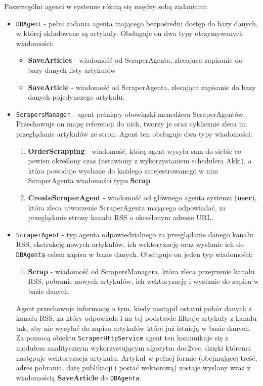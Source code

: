 \par Poszczególni agenci w systemie różnią się między sobą zadaniami:
\begin{itemize}
	\item \texttt{DBAgent} - pełni zadania agenta mającego bezpośredni dostęp do bazy danych, w której składowane są artykuły. Obsługuje on dwa typy otrzymywanych wiadomości:
     \begin{itemize}
      \item \textbf{SaveArticles} - wiadomość od ScraperAgenta, zlecająca zapisanie do bazy danych listy artykułów
      \item \textbf{SaveArticle} - wiadomość od ScraperAgenta, zlecająca zapisanie do bazy danych pojedynczego artykułu.
     \end{itemize}
                                                                                                                                    	\item \texttt{ScrapersManager} - agent pełniący obowiązki menedżera ScraperAgentów. Przechowuje on mapę referencji do nich, tworzy je oraz cyklicznie zleca im przeglądanie artykułów ze stron. Agent ten obsługuje dwa typy wiadomości:
     \begin{enumerate}
      \item \textbf{OrderScrapping} - wiadomość, którą agent wysyła sam do siebie co pewien określony czas (ustawiony z wykorzystaniem schedulera Akki), a która powoduje wysłanie do każdego zarejestrowanego w nim ScraperAgenta wiadomości typu \textbf{Scrap}
      \item \textbf{CreateScraperAgent} - wiadomość od głównego agenta systemu (\textbf{user}), która zleca utworzenie ScraperAgenta mającego odpowiadać, za przeglądanie strony kanału RSS o określonym adresie URL.
     \end{enumerate}
                                                                                                                                    	\item \texttt{ScraperAgent} - typ agenta odpowiedzialnego za przeglądanie danego kanału RSS, ekstrakcję nowych artykułów, ich wektoryzację oraz wysłanie ich do \texttt{DBAgenta} celem zapisu w bazie danych. Obsługuje on jeden typ wiadomości:
     \begin{enumerate}
      \item \textbf{Scrap} - wiadomość od ScrapersManagera, która zleca przejrzenie kanału RSS, pobranie nowych artykułów, ich wektoryzację i wysłanie do zapisu w bazie danych.
     \end{enumerate}
     Agent przechowuje informację o tym, kiedy nastąpił ostatni pobór danych z kanału RSS, za który odpowiada i na tej podstawie filtruje artykuły z kanału tak, aby nie wysyłać do zapisu artykułów które już istnieją w bazie danych. Za pomocą obiektu \texttt{ScraperHttpService} agent ten komunikuje się z modułem analitycznym wykorzystującym algorytm doc2vec, dzięki któremu następuje wektoryzacja artykułu. Artykuł w pełnej formie (obejmującej treść, adres pobrania, datę publikacji i postać wektorową) zostaje wysłany wraz z wiadomością \textbf{SaveArticle} do \texttt{DBAgenta}.

\end{itemize}

